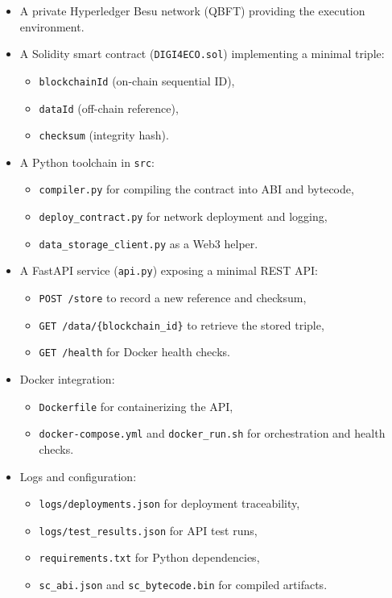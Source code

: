 \documentclass[11pt,a4paper]{article}
\begin{document}
\begin{itemize}[noitemsep]
  \item A private Hyperledger Besu network (QBFT) providing the execution environment.
  \item A Solidity smart contract (\texttt{DIGI4ECO.sol}) implementing a minimal triple:
        \begin{itemize}
          \item \texttt{blockchainId} (on-chain sequential ID),
          \item \texttt{dataId} (off-chain reference),
          \item \texttt{checksum} (integrity hash).
        \end{itemize}
  \item A Python toolchain in \texttt{src}:
        \begin{itemize}
          \item \texttt{compiler.py} for compiling the contract into ABI and bytecode,
          \item \texttt{deploy\_contract.py} for network deployment and logging,
          \item \texttt{data\_storage\_client.py} as a Web3 helper.
        \end{itemize}
  \item A FastAPI service (\texttt{api.py}) exposing a minimal REST API:
        \begin{itemize}
          \item \texttt{POST /store} to record a new reference and checksum,
          \item \texttt{GET /data/\{blockchain\_id\}} to retrieve the stored triple,
          \item \texttt{GET /health} for Docker health checks.
        \end{itemize}
  \item Docker integration:
        \begin{itemize}
          \item \texttt{Dockerfile} for containerizing the API,
          \item \texttt{docker-compose.yml} and \texttt{docker\_run.sh} for orchestration and health checks.
        \end{itemize}
  \item Logs and configuration:
        \begin{itemize}
          \item \texttt{logs/deployments.json} for deployment traceability,
          \item \texttt{logs/test\_results.json} for API test runs,
          \item \texttt{requirements.txt} for Python dependencies,
          \item \texttt{sc\_abi.json} and \texttt{sc\_bytecode.bin} for compiled artifacts.
        \end{itemize}
\end{itemize}
\end{document}
